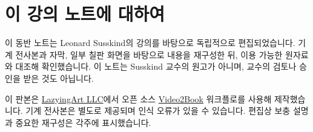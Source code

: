 \documentclass[11pt,oneside]{book}
\begin{document}
\frontmatter
\hypersetup{pageanchor=false}

\hypersetup{pageanchor=true}

\clearpage
\chapter{이 강의 노트에 대하여}
이 동반 노트는 Leonard Susskind의 강의를 바탕으로 독립적으로 편집되었습니다. 기계 전사본과 자막, 일부 칠판 화면을 바탕으로 내용을 재구성한 뒤, 이용 가능한 원자료와 대조해 확인했습니다. 이 노트는 Susskind 교수의 원고가 아니며, 교수의 검토나 승인을 받은 것도 아닙니다.

이 판본은 \href{https://lazying.art}{LazyingArt LLC}에서 오픈 소스 \href{https://github.com/lachlanchen/Video2Book}{Video2Book} 워크플로를 사용해 제작했습니다. 기계 전사본은 별도로 제공되며 인식 오류가 있을 수 있습니다. 편집상 보충 설명과 중요한 재구성은 각주에 표시했습니다.
\clearpage
\tableofcontents
\mainmatter










\end{document}
